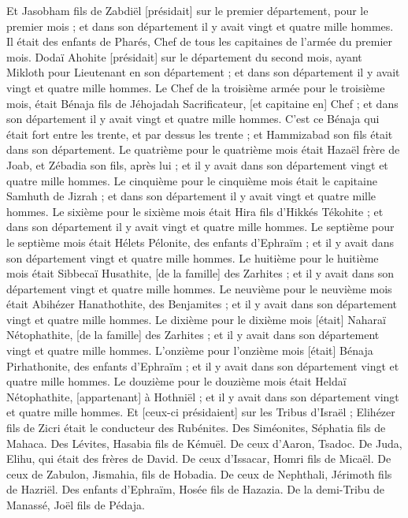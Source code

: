 \begin{multicols}{2}
Et Jasobham fils de Zabdiël [présidait] sur le premier département, pour le premier mois ; et dans son département il y avait vingt et quatre mille hommes.
Il était des enfants de Pharés, Chef de tous les capitaines de l'armée du premier mois.
Dodaï Ahohite [présidait] sur le département du second mois, ayant Mikloth pour Lieutenant en son département ; et dans son département il y avait vingt et quatre mille hommes.
Le Chef de la troisième armée pour le troisième mois, était Bénaja fils de Jéhojadah Sacrificateur, [et capitaine en] Chef ; et dans son département il y avait vingt et quatre mille hommes.
C'est ce Bénaja qui était fort entre les trente, et par dessus les trente ; et Hammizabad son fils était dans son département.
Le quatrième pour le quatrième mois était Hazaël frère de Joab, et Zébadia son fils, après lui ; et il y avait dans son département vingt et quatre mille hommes.
Le cinquième pour le cinquième mois était le capitaine Samhuth de Jizrah ; et dans son département il y avait vingt et quatre mille hommes.
Le sixième pour le sixième mois était Hira fils d'Hikkés Tékohite ; et dans son département il y avait vingt et quatre mille hommes.
Le septième pour le septième mois était Hélets Pélonite, des enfants d'Ephraïm ; et il y avait dans son département vingt et quatre mille hommes.
Le huitième pour le huitième mois était Sibbecaï Husathite, [de la famille] des Zarhites ; et il y avait dans son département vingt et quatre mille hommes.
Le neuvième pour le neuvième mois était Abihézer Hanathothite, des Benjamites ; et il y avait dans son département vingt et quatre mille hommes.
Le dixième pour le dixième mois [était] Naharaï Nétophathite, [de la famille] des Zarhites ; et il y avait dans son département vingt et quatre mille hommes.
L'onzième pour l'onzième mois [était] Bénaja Pirhathonite, des enfants d'Ephraïm ; et il y avait dans son département vingt et quatre mille hommes.
Le douzième pour le douzième mois était Heldaï Nétophathite, [appartenant] à Hothniël ; et il y avait dans son département vingt et quatre mille hommes.
Et [ceux-ci présidaient] sur les Tribus d'Israël ; Elihézer fils de Zicri était le conducteur des Rubénites. Des Siméonites, Séphatia fils de Mahaca.
Des Lévites, Hasabia fils de Kémuël. De ceux d'Aaron, Tsadoc.
De Juda, Elihu, qui était des frères de David. De ceux d'Issacar, Homri fils de Micaël.
De ceux de Zabulon, Jismahia, fils de Hobadia. De ceux de Nephthali, Jérimoth fils de Hazriël.
Des enfants d'Ephraïm, Hosée fils de Hazazia. De la demi-Tribu de Manassé, Joël fils de Pédaja.

\end{multicols}
